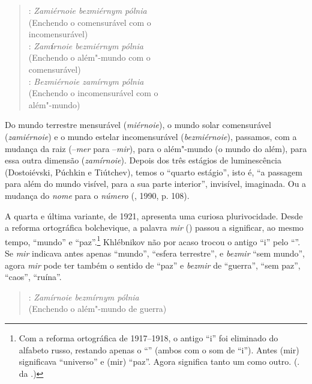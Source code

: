\begin{verse}
: \emph{Zamiérnoie bezmiérnym pólnia} \\
(Enchendo o comensurável com o \\
incomensurável) \\[8pt]

: \emph{Zam\textbf{í}rnoie bezmiérnym pólnia} \\
(Enchendo o além"-mundo com o \\
comensurável) \\[8pt]

: \emph{Bezmiérnoie zamírnym pólnia} \\
(Enchendo o incomensurável com o \\
além"-mundo)
\end{verse}

Do mundo terrestre mensurável (\emph{miérnoie}), o mundo solar
comensurável (\emph{zamiérnoie}) e o mundo estelar incomensurável
(\emph{bezmiérnoie}), passamos, com a mudança da raiz (--\emph{mer} para
--\emph{mir}), para o além"-mundo (o mundo do além), para essa outra
dimensão (\emph{zamírnoie}). Depois dos três estágios de luminescência
(Dostoiévski, Púchkin e Tiútchev), temos o ``quarto estágio'', isto é,
``a passagem para além do mundo visível, para a sua parte interior'',
invisível, imaginada. Ou a mudança do \emph{nome} para o \emph{número}
(, 1990, p. 108).

A quarta e última variante, de 1921, apresenta uma curiosa plurivocidade.
Desde a reforma ortográfica bolchevique, a palavra \emph{mir} ({}) passou a significar, ao mesmo
tempo, ``mundo'' e ``paz''.\footnote{Com a reforma ortográfica de 1917--1918, o antigo ``i''
  foi eliminado do alfabeto russo, restando apenas o ``{}'' (ambos com o
  som de ``i''). Antes {} (mir) significava ``universo'' e {} (mir)
  ``paz''. Agora {} significa tanto um como outro. (. da .)}
Khlébnikov não por acaso trocou o antigo ``i'' pelo ``{}''. Se \emph{mir}
indicava antes apenas ``mundo'', ``esfera terrestre'', e \emph{bezmir}
``sem mundo'', agora \emph{mir} pode ter também o sentido de ``paz'' e
\emph{bezmir} de ``guerra'', ``sem paz'', ``caos'', ``ruína''.

\begin{verse}
: \emph{Zamírnoie bezmírnym pólnia} \\
(Enchendo o além"-mundo de guerra)
\end{verse}

